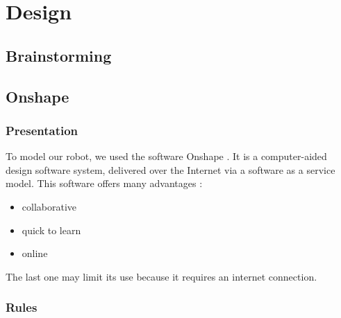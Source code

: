 \section{Design}\insertloftspace
\setcounter{figure}{0}\setcounter{table}{0}

\subsection{Brainstorming}

\subsection{Onshape}
\subsubsection{Presentation}

To model our robot, we used the software Onshape \cite{Onshape}. It is a computer-aided design software system, delivered over the Internet via a software as a service model. This software offers many advantages : 
\begin{itemize}[noitemsep]
    \item collaborative
    \item quick to learn
    \item online
\end{itemize}

The last one may limit its use because it requires an internet connection.

\subsubsection{Rules}

